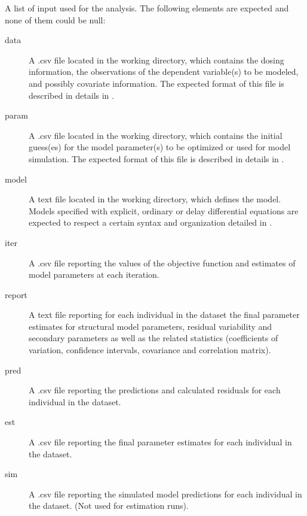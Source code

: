 \begin{Arguments}
\begin{ldescription}
\item[\code{files}] A list of input used for the analysis. The following elements are
expected and none of them could be null: \begin{description}

\item[data] A .csv file located in the working directory, which contains
the dosing information, the observations of the dependent variable(s)
to be modeled, and possibly covariate information. The expected format 
of this file is described in details in .
\item[param] A .csv file located in the working directory, which contains
the initial guess(es) for the model parameter(s) to be optimized or used
for model simulation. The expected format of this file is described in
details in .
\item[model] A text file located in the working directory, which defines 
the model. Models specified with explicit, ordinary or delay 
differential equations are expected to respect a certain syntax and 
organization detailed in .
\item[iter] A .csv file reporting the values of the objective function
and estimates of model parameters at each iteration.
\item[report] A text file reporting for each individual in the dataset the
final parameter estimates for structural model parameters, residual 
variability and secondary parameters as well as the related statistics 
(coefficients of variation, confidence intervals, covariance and 
correlation matrix).
\item[pred] A .csv file reporting the predictions and calculated residuals
for each individual in the dataset.
\item[est] A .csv file reporting the final parameter estimates for each
individual in the dataset.
\item[sim] A .csv file reporting the simulated model predictions for each 
individual in the dataset. (Not used for estimation runs).

\end{description}


\end{ldescription}
\end{Arguments}
%
